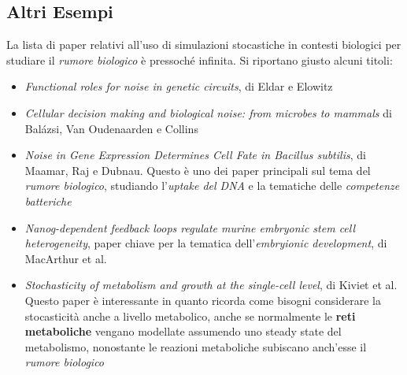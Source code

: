 \documentclass[a4paper,12pt, oneside]{book}
\begin{document}
\subsection{Altri Esempi}
La lista di paper relativi all'uso di simulazioni stocastiche in contesti
biologici per studiare il \textit{rumore biologico} è pressoché infinita. Si
riportano giusto alcuni titoli: 
\begin{itemize}
  \item \textit{Functional roles for noise in genetic circuits}, di Eldar e
  Elowitz
  \item \textit{Cellular decision making and biological noise: from microbes to
    mammals} di Balázsi, Van Oudenaarden e Collins 
  \item \textit{Noise in Gene Expression Determines Cell Fate in Bacillus
    subtilis}, di Maamar, Raj e Dubnau. Questo è uno dei paper principali sul
  tema del \textit{rumore biologico}, studiando l'\textit{uptake del DNA} e la
  tematiche delle \textit{competenze batteriche}
  \item \textit{Nanog-dependent feedback loops regulate murine embryonic stem
    cell heterogeneity}, paper chiave per la tematica dell'\textit{embryionic
    development}, di MacArthur et al. 
  \item \textit{Stochasticity of metabolism and growth at the single-cell
    level}, di Kiviet et al. Questo paper è interessante in quanto ricorda come
  bisogni considerare la stocasticità anche a livello metabolico, anche se
  normalmente le \textbf{reti metaboliche} vengano modellate assumendo uno
  steady state del metabolismo, nonostante le reazioni metaboliche subiscano
  anch'esse il \textit{rumore biologico}
\end{itemize}
\end{document}
